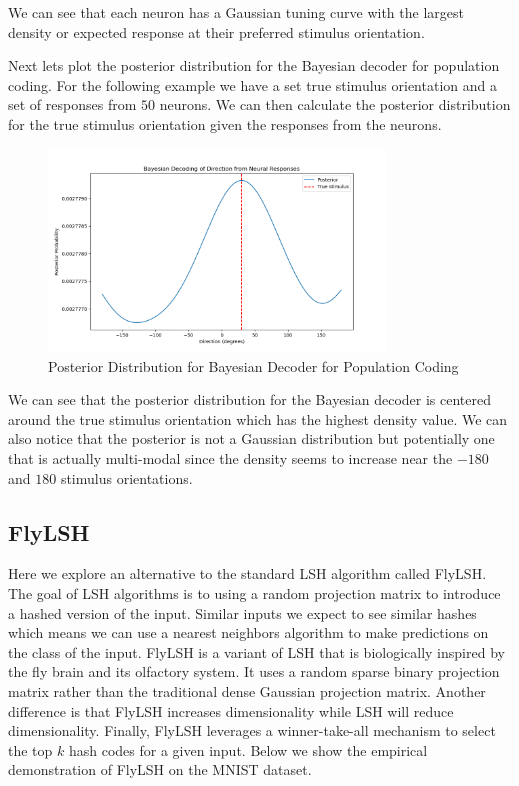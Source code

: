 \documentclass[12pt, letterpaper]{article}
\begin{document}
We can see that each neuron has a Gaussian tuning curve with the largest density or expected response at their preferred stimulus orientation.

Next lets plot the posterior distribution for the Bayesian decoder for population coding. For the following example we have a set true stimulus orientation and a set of responses from $50$ neurons. We can then calculate the posterior distribution for the true stimulus orientation given the responses from the neurons.

\begin{figure}[H]
    \centering
    \includegraphics[width=0.8\textwidth]{bayesian_decoder.png}
    \caption{Posterior Distribution for Bayesian Decoder for Population Coding}
    \label{fig:bayesian_decoder}
\end{figure}

We can see that the posterior distribution for the Bayesian decoder is centered around the true stimulus orientation which has the highest density value. We can also notice that the posterior is not a Gaussian distribution but potentially one that is actually multi-modal since the density seems to increase near the $-180$ and $180$ stimulus orientations. 

\subsection{FlyLSH}
Here we explore an alternative to the standard LSH algorithm called FlyLSH. The goal of LSH algorithms is to using a random projection matrix to introduce a hashed version of the input. Similar inputs we expect to see similar hashes which means we can use a nearest neighbors algorithm to make predictions on the class of the input. FlyLSH is a variant of LSH that is biologically inspired by the fly brain and its olfactory system. It uses a random sparse binary projection matrix rather than the traditional dense Gaussian projection matrix. Another difference is that FlyLSH increases dimensionality while LSH will reduce dimensionality. Finally, FlyLSH leverages a winner-take-all mechanism to select the top $k$ hash codes for a given input. Below we show the empirical demonstration of FlyLSH on the MNIST dataset.
\end{document}
